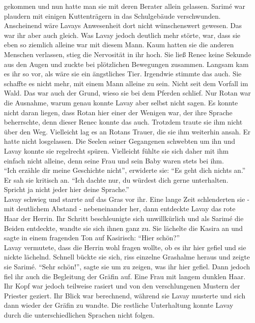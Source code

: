 gekommen und nun hatte man sie mit deren Berater allein gelassen. Sarimé war plaudern mit einigen 
Kuttenträgern in das Schulgebäude verschwunden. Anscheinend wäre Lavays Anwesenheit dort nicht 
wünschenswert gewesen. Das war ihr aber auch gleich. Was Lavay jedoch deutlich mehr störte, war, 
dass sie eben so ziemlich alleine war mit diesem Mann. Kaum hatten sie die anderen Menschen 
verlassen, stieg die Nervosität in ihr hoch. Sie ließ Renec keine Sekunde aus den Augen und zuckte 
bei plötzlichen Bewegungen zusammen. Langsam kam es ihr so vor, als wäre sie ein ängstliches Tier. 
Irgendwie stimmte das auch. Sie schaffte es nicht mehr, mit einem Mann alleine zu sein. Nicht seit 
dem Vorfall im Wald. Das war auch der Grund, wieso sie bei dem Pferden schlief. Nur Rotan war die 
Ausnahme, warum genau konnte Lavay aber selbst nicht sagen. Es konnte nicht daran liegen, dass 
Rotan hier einer der Wenigen war, der ihre Sprache beherrschte, denn dieser Renec konnte das auch. 
Trotzdem traute sie ihm nicht über den Weg. Vielleicht lag es an Rotans Trauer, die sie ihm 
weiterhin ansah. Er hatte nicht losgelassen. Die Seelen seiner Gegangenen schwebten um ihn und 
Lavay konnte sie regelrecht spüren. Vielleicht fühlte sie sich daher mit ihm einfach nicht alleine, 
denn seine Frau und sein Baby waren stets bei ihm.\\
``Ich erzähle dir meine Geschichte nicht'', erwiderte sie: ``Es geht dich nichts an.''\\
Er sah sie kritisch an. ``Ich dachte nur, du würdest dich gerne unterhalten. Spricht ja nicht jeder 
hier deine Sprache.''\\
Lavay schwieg und starrte auf das Gras vor ihr. Eine lange Zeit schlenderten sie - mit deutlichem 
Abstand - nebeneinander her, dann entdeckte Lavay das rote Haar der Herrin. Ihr Schritt 
beschleunigte sich unwillkürlich und als Sarimé die Beiden entdeckte, wandte sie sich ihnen ganz 
zu. Sie lächelte die Kasira an und sagte in einem fragenden Ton auf Kasirisch: ``Hier schön?''\\
Lavay vermutete, dass die Herrin wohl fragen wollte, ob es ihr hier gefiel und sie nickte lächelnd. 
Schnell bückte sie sich, riss einzelne Grashalme heraus und zeigte sie Sarimé. ``Sehr schön!'', 
sagte sie um zu zeigen, was ihr hier gefiel. Dann jedoch fiel ihr auch die Begleitung der Gräfin 
auf. Eine Frau mit langem dunklen Haar. Ihr Kopf war jedoch teilweise rasiert und von den 
verschlungenen Mustern der Priester geziert. Ihr Blick war berechnend, während sie Lavay musterte 
und sich dann wieder der Gräfin zu wandte. Die restliche Unterhaltung konnte Lavay durch die 
unterschiedlichen Sprachen nicht folgen.\\

